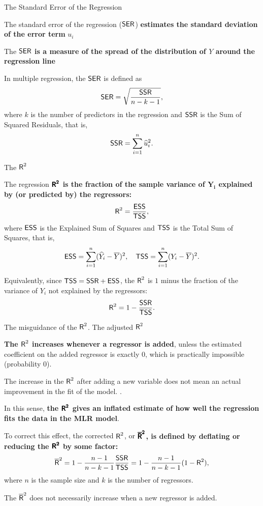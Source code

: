 \documentclass[aspectratio=169]{beamer}
\begin{document}

\begin{frame}{The Standard Error of the Regression}

The standard error of the regression ($\textsf{SER}$) \textbf{estimates the standard deviation of the error term} $u_i$
\vspace{0.3cm}

The $\textsf{SER}$ \textbf{is a measure of the spread of the distribution of $Y$ around the regression line} 
\vspace{0.3cm}

In multiple regression, the $\textsf{SER}$ is defined as
$$
\textsf{SER} = \sqrt{\frac{\textsf{SSR}}{n-k-1}}, 
$$
where $k$ is the number of predictors in the regression and $\textsf{SSR}$ is the Sum of Squared Residuals, that is,
$$
\textsf{SSR} = \sum_{i=1}^n \widehat{u}_i^2.
$$
\end{frame}


\begin{frame}{The $\textsf{R}^2$}

The regression \textbf{$\pmb{\textsf{R}^2}$ is the fraction of the sample variance of $\pmb{Y_i}$ explained by (or predicted by) the regressors:} 
$$
\textsf{R}^2 = \frac{\textsf{ESS}}{\textsf{TSS}},
$$
where $\textsf{ESS}$ is the Explained Sum of Squares and $\textsf{TSS}$ is the Total Sum of Squares, that is,
$$
\textsf{ESS} = \sum_{i=1}^n (\widehat{Y}_i - \overline{Y})^2,\quad \textsf{TSS} = \sum_{i=1}^n (Y_i - \overline{Y})^2.
$$
\vspace{0.1cm}

Equivalently, since $\textsf{TSS} = \textsf{SSR} + \textsf{ESS}$, the $\textsf{R}^2$ is $1$ minus the fraction of the variance of $Y_i$ not explained by the regressors: 
$$
\textsf{R}^2 = 1 - \frac{\textsf{SSR}}{\textsf{TSS}}.
$$

\end{frame}


\begin{frame}{The misguidance of the $\textsf{R}^2$. The adjusted $\textsf{R}^2$}

\textbf{The $\textsf{R}^2$ increases whenever a regressor is added}, unless the estimated coefficient on the added regressor is exactly $0$, which is practically impossible (probability $0$). 
\vspace{0.2cm}

The increase in the $\textsf{R}^2$ after adding a new variable does not mean an actual improvement in the fit of the model. .
\vspace{0.2cm}

In this sense, \textbf{the $\pmb{\textsf{R}^2}$ gives an inflated estimate of how well the regression fits the data in the MLR model}. 
\vspace{0.2cm}

To correct this effect, the corrected $\textsf{R}^2$, or \textbf{$\pmb{\overline{\textsf{R}}^2}$, is defined by deflating or reducing the $\pmb{\textsf{R}^2}$ by some factor:}
$$
\overline{\textsf{R}}^2 = 1 - \frac{n-1}{n-k-1}\frac{\textsf{SSR}}{\textsf{TSS}} = 1 - \frac{n-1}{n-k-1}(1 - \textsf{R}^2),
$$
where $n$ is the sample size and $k$ is the number of regressors.
\vspace{0.3cm}

The $\overline{\textsf{R}}^2$ does not necessarily increase when a new regressor is added.
\end{frame}
\end{document}
